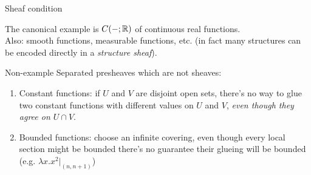 \begin{frame}{Sheaf condition}
	\begin{example}
		The canonical example is $C(-; \mathbb{R})$ of continuous real functions.\\
		Also: smooth functions, measurable functions, etc. (in fact many structures can be encoded directly in a \emph{structure sheaf}).
	\end{example}
	\begin{block}{Non-example}
		Separated presheaves which are not sheaves:
		\begin{enumerate}
			\item Constant functions: if $U$ and $V$ are disjoint open sets, there's no way to glue two constant functions with different values on $U$ and $V$, \emph{even though they agree on $U \cap V$}.
			\item Bounded functions: choose an infinite covering, even though every local section might be bounded there's no guarantee their glueing will be bounded (e.g. $\lambda x.x^2\vert_{(n,n+1)}$)
		\end{enumerate}
	\end{block}
\end{frame}


